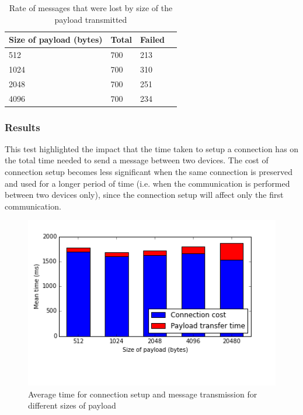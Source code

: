 \begin{table}[ht]
\centering
\begin{tabular}{llll}
\hline
Size of payload (bytes) & Total     & Failed    \\ \hline
512                     & 700       & 213       \\
1024                    & 700       & 310       \\
2048                    & 700       & 251       \\
4096                    & 700       & 234       \\
\hline
\end{tabular}
\caption{Rate of messages that were lost by size of the payload transmitted}
\label{table:failure_rate_payload_size}
\end{table}

\subsubsection{Results}
This test highlighted the impact that the time taken to setup a connection has on the total time needed to send a message between two devices.
The cost of connection setup becomes less significant when the same connection is preserved and used for a longer period of time (i.e. when the communication is performed between two devices only), since the connection setup will affect only the first communication.

\begin{figure}[ht!]
  \centering
  \includegraphics[width=1.0\textwidth]{application/img/setup_with_transfer.png}
  \caption{Average time for connection setup and message transmission for different sizes of payload}
  \label{figure:conn_vs_transfer}
\end{figure}

